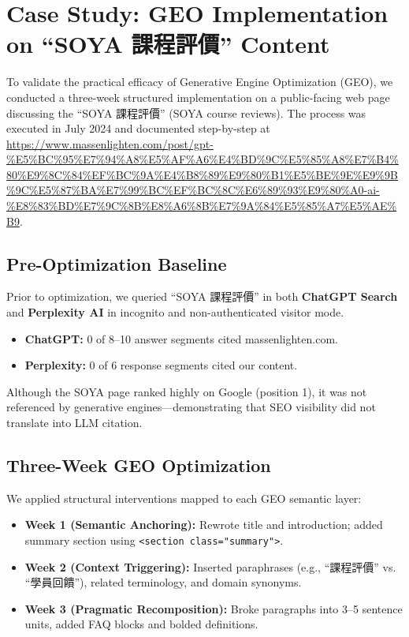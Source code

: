 \section{Case Study: GEO Implementation on “SOYA 課程評價” Content}

To validate the practical efficacy of Generative Engine Optimization (GEO), we conducted a three-week structured implementation on a public-facing web page discussing the “SOYA 課程評價” (SOYA course reviews). The process was executed in July 2024 and documented step-by-step at \url{https://www.massenlighten.com/post/gpt-%E5%BC%95%E7%94%A8%E5%AF%A6%E4%BD%9C%E5%85%A8%E7%B4%80%E9%8C%84%EF%BC%9A%E4%B8%89%E9%80%B1%E5%BE%9E%E9%9B%9C%E5%87%BA%E7%99%BC%EF%BC%8C%E6%89%93%E9%80%A0-ai-%E8%83%BD%E7%9C%8B%E8%A6%8B%E7%9A%84%E5%85%A7%E5%AE%B9}.

\subsection{Pre-Optimization Baseline}

Prior to optimization, we queried “SOYA 課程評價” in both \textbf{ChatGPT Search} and \textbf{Perplexity AI} in incognito and non-authenticated visitor mode.

\begin{itemize}
  \item \textbf{ChatGPT:} 0 of 8--10 answer segments cited massenlighten.com.
  \item \textbf{Perplexity:} 0 of 6 response segments cited our content.
\end{itemize}

Although the SOYA page ranked highly on Google (position 1), it was not referenced by generative engines—demonstrating that SEO visibility did not translate into LLM citation.

\subsection{Three-Week GEO Optimization}

We applied structural interventions mapped to each GEO semantic layer:

\begin{itemize}
  \item \textbf{Week 1 (Semantic Anchoring):} Rewrote title and introduction; added summary section using \texttt{<section class="summary">}.
  \item \textbf{Week 2 (Context Triggering):} Inserted paraphrases (e.g., “課程評價” vs. “學員回饋”), related terminology, and domain synonyms.
  \item \textbf{Week 3 (Pragmatic Recomposition):} Broke paragraphs into 3--5 sentence units, added FAQ blocks and bolded definitions.
\end{itemize}

